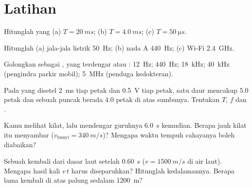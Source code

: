 \section{Latihan}

\begin{exercise}[$\star$]\label{exo:g10:signals-and-waves:1}
Hitunglah   yang 
(a) $T = \qty{20}{ms}$; (b) $T = \qty{4.0}{ms}$;
(c) $T = \qty{50}{\micro s}$.
\end{exercise}

\begin{exercise}[$\star$]\label{exo:g10:signals-and-waves:2}
Hitunglah  (a) jala-jala listrik \qty{50}{Hz}; (b) nada A
\qty{440}{Hz}; (c)  Wi-Fi \qty{2.4}{GHz}.
\end{exercise}

\begin{exercise}[$\star$]\label{exo:g10:signals-and-waves:3}
Golongkan sebagai ,  yang terdengar atau :
\qty{12}{Hz}; \qty{440}{Hz}; \qty{18}{kHz}; \qty{40}{kHz} (pengindra
parkir mobil); \qty{5}{MHz} (penduga kedokteran).
\end{exercise}

\begin{exercise}[$\star$]\label{exo:g10:signals-and-waves:4}
Pada  yang disetel \qty{2}{ms} tiap petak dan \qty{0.5}{V} tiap
petak, satu daur mencakup $5.0$ petak dan sebuah puncak berada $4.0$
petak di atas sumbunya. Tentukan $T$, $f$ dan .
\end{exercise}

\begin{exercise}[$\star$]\label{exo:g10:signals-and-waves:5}
Kamu melihat kilat, lalu mendengar guruhnya \qty{6.0}{s} kemudian.
Berapa jauh kilat itu menyambar ($v_{\text{bunyi}} = \qty{340}{m/s}$)?
Mengapa waktu tempuh cahayanya boleh diabaikan?
\end{exercise}

\begin{exercise}[$\star\star$]\label{exo:g10:signals-and-waves:6}
Sebuah   kembali dari dasar laut setelah \qty{0.60}{s}
($v = \qty{1500}{m/s}$ di air laut). Mengapa hasil kali $v\,t$ harus
diseparuhkan? Hitunglah kedalamannya. Berapa lama  kembali di
atas palung sedalam \qty{1200}{m}?
\end{exercise}

